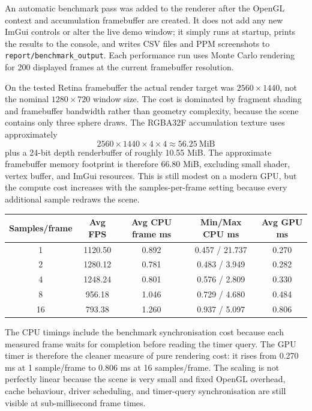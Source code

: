 \documentclass[12pt]{article}
\begin{document}
An automatic benchmark pass was added to the renderer after the OpenGL context and accumulation framebuffer are created. It does not add any new ImGui controls or alter the live demo window; it simply runs at startup, prints the results to the console, and writes CSV files and PPM screenshots to \texttt{report/benchmark\_output}. Each performance run uses Monte Carlo rendering for 200 displayed frames at the current framebuffer resolution.

On the tested Retina framebuffer the actual render target was $2560 \times 1440$, not the nominal $1280 \times 720$ window size. The cost is dominated by fragment shading and framebuffer bandwidth rather than geometry complexity, because the scene contains only three sphere draws. The RGBA32F accumulation texture uses approximately
\[
2560 \times 1440 \times 4 \times 4 \approx 56.25\ \mathrm{MiB}
\]
plus a 24-bit depth renderbuffer of roughly 10.55 MiB. The approximate framebuffer memory footprint is therefore 66.80 MiB, excluding small shader, vertex buffer, and ImGui resources. This is still modest on a modern GPU, but the compute cost increases with the samples-per-frame setting because every additional sample redraws the scene.

\begin{center}
\small
\begin{tabular}{|c|c|c|c|c|}
\hline
\textbf{Samples/frame} & \textbf{Avg FPS} & \textbf{Avg CPU frame ms} & \textbf{Min/Max CPU ms} & \textbf{Avg GPU ms} \\
\hline
1 & 1120.50 & 0.892 & 0.457 / 21.737 & 0.270 \\
\hline
2 & 1280.12 & 0.781 & 0.483 / 3.949 & 0.282 \\
\hline
4 & 1248.24 & 0.801 & 0.576 / 2.809 & 0.330 \\
\hline
8 & 956.18 & 1.046 & 0.729 / 4.680 & 0.484 \\
\hline
16 & 793.38 & 1.260 & 0.937 / 5.097 & 0.806 \\
\hline
\end{tabular}
\end{center}

The CPU timings include the benchmark synchronisation cost because each measured frame waits for completion before reading the timer query. The GPU timer is therefore the cleaner measure of pure rendering cost: it rises from 0.270 ms at 1 sample/frame to 0.806 ms at 16 samples/frame. The scaling is not perfectly linear because the scene is very small and fixed OpenGL overhead, cache behaviour, driver scheduling, and timer-query synchronisation are still visible at sub-millisecond frame times.
\end{document}
